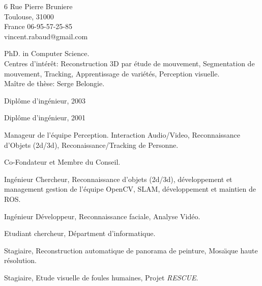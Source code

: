 

\addresses
{6 Rue Pierre Bruniere\\
Toulouse, 31000\\
France}
{
06-95-57-25-85\\
vincent.rabaud@gmail.com}

\begin{llist}

 
PhD. in Computer Science.\\
Centres d'int\'{e}r\^{e}t: Reconstruction 3D par \'{e}tude de mouvement, Segmentation de mouvement, Tracking, Apprentissage de vari\'{e}t\'{e}s, Perception visuelle.\\
Ma\^{i}tre de th\`{e}se: Serge Belongie.

 
Dipl\^{o}me d'ing\'{e}nieur, 2003

 
Dipl\^{o}me d'ing\'{e}nieur, 2001

Manageur de l'\'{e}quipe Perception. Interaction Audio/Video, Reconnaissance d'Objets (2d/3d), Reconaissance/Tracking de Personne.

Co-Fondateur et Membre du Conseil.

Ing\'{e}nieur Chercheur, Reconnaissance d'objets (2d/3d), d\'{e}veloppement et management gestion de l'\'{e}quipe 
OpenCV, SLAM, d\'{e}veloppement et maintien de ROS.

Ing\'{e}nieur D\'{e}veloppeur, Reconnaissance faciale, Analyse
Vid\'{e}o.

Etudiant chercheur, D\'{e}partment d'informatique.

Stagiaire, Reconstruction automatique de panorama de peinture, Mosa\"{\i}que haute r\'{e}solution.

Stagiaire, Etude visuelle de foules humaines, Projet {\em RESCUE}.


\end{llist}

